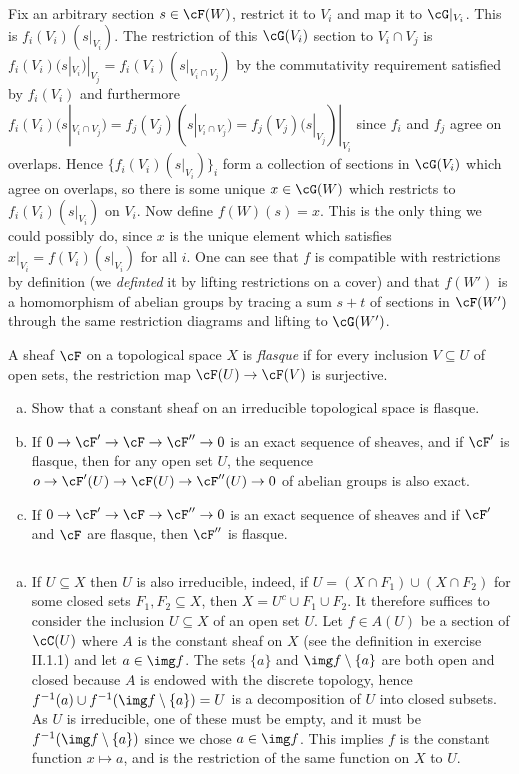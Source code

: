 \begin{homework}[e]
\begin{prf}
		Fix an arbitrary section $s \in \cF(W)$, restrict it to $V_i$ and map it to $\cG|_{V_i}$. This is $f_i(V_i)(s|_{V_i})$. The restriction of this $\cG(V_i)$ section to $V_i\cap V_j$ is $f_i(V_i)(s|_{V_i})|_{V_j} = f_i(V_i)(s|_{V_i\cap V_j})$ by the commutativity requirement satisfied by $f_i(V_i)$ and furthermore $f_i(V_i)(s|_{V_i\cap V_j}) = f_j(V_j)(s|_{V_i\cap V_j}) = f_j(V_j)(s|_{V_j})|_{V_i}$ since $f_i$ and $f_j$ agree on overlaps. Hence $\{f_i(V_i)(s|_{V_i})\}_i$ form a collection of sections in $\cG(V_i)$ which agree on overlaps, so there is some unique $x \in \cG(W)$ which restricts to $f_i(V_i)(s|_{V_i})$ on $V_i$. Now define $f(W)(s) = x$. This is the only thing we could possibly do, since $x$ is the unique element which satisfies $x|_{V_i} = f(V_i)(s|_{V_i})$ for all $i$. One can see that $f$ is compatible with restrictions by definition (we \emph{definted} it by lifting restrictions on a cover) and that $f(W')$ is a homomorphism of abelian groups by tracing a sum $s + t$ of sections in $\cF(W')$ through the same restriction diagrams and lifting to $\cG(W')$.
	\end{prf}
	 A sheaf $\cF$ on a topological space $X$ is \emph{flasque} if for every inclusion $V\subseteq U$ of open sets, the restriction map $\cF(U) \to \cF(V)$ is surjective.
	\begin{enumerate}[(a)]
		\item Show that a constant sheaf on an irreducible topological space is flasque.
		\item If $0 \to \cF' \to \cF\to \cF''\to 0$ is an exact sequence of sheaves, and if $\cF'$ is flasque, then for any open set $U$, the sequence $o\to \cF'(U)\to \cF(U)\to \cF''(U)\to 0$ of abelian groups is also exact.
		\item If $0 \to \cF' \to \cF \to \cF''\to 0$ is an exact sequence of sheaves and if $\cF'$ and $\cF$ are flasque, then $\cF''$ is flasque.
	\end{enumerate}
	\begin{prf}$ $
		\begin{enumerate}[(a)]
			\item If $U \subseteq X$ then $U$ is also irreducible, indeed, if $U = (X\cap F_1)\cup (X \cap F_2)$ for some closed sets $F_1,F_2 \subseteq X$, then $X = U^c \cup F_1 \cup F_2$. It therefore suffices to consider the inclusion $U\subseteq X$ of an open set $U$. Let $f \in A(U)$ be a section of $\cC(U)$ where $A$ is the constant sheaf on $X$ (see the definition in exercise II.1.1) and let $a \in \img f$. The sets $\{a\}$ and $\img f\setminus \{a\}$ are both open and closed because $A$ is endowed with the discrete topology, hence $f^{-1}(a)\cup f^{-1}(\img f\setminus \{a\}) = U$ is a decomposition of $U$ into closed subsets. As $U$ is irreducible, one of these must be empty, and it must be $f^{-1}(\img f\setminus \{a\})$ since we chose $a\in \img f$. This implies $f$ is the constant function $x \mapsto a$, and is the restriction of the same function on $X$ to $U$.

\end{enumerate}
\end{prf}
\end{homework}
